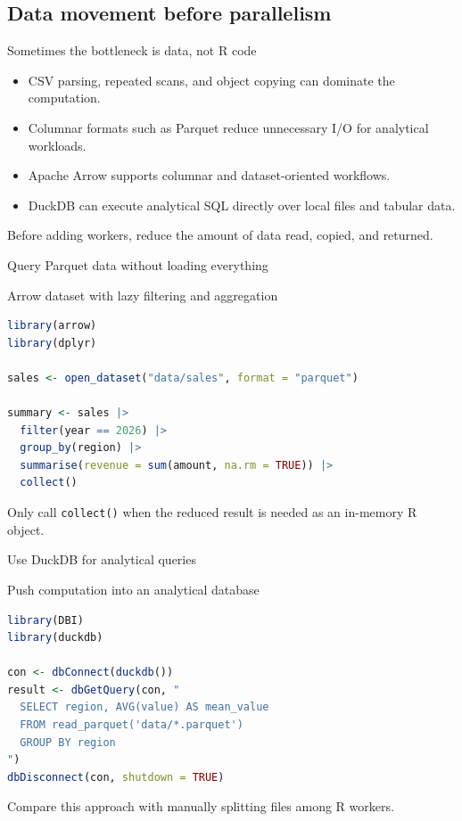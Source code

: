 \subsection{Data movement before parallelism}

\begin{frame}{Sometimes the bottleneck is data, not R code}
\begin{itemize}
  \item CSV parsing, repeated scans, and object copying can dominate the computation.
  \item Columnar formats such as Parquet reduce unnecessary I/O for analytical workloads.
  \item Apache Arrow supports columnar and dataset-oriented workflows.
  \item DuckDB can execute analytical SQL directly over local files and tabular data.
\end{itemize}
\vspace{0.2cm}
Before adding workers, reduce the amount of data read, copied, and returned.
\end{frame}

\begin{frame}[fragile]{Query Parquet data without loading everything}
\begin{block}{Arrow dataset with lazy filtering and aggregation}
\begin{lstlisting}[language=R]
library(arrow)
library(dplyr)

sales <- open_dataset("data/sales", format = "parquet")

summary <- sales |>
  filter(year == 2026) |>
  group_by(region) |>
  summarise(revenue = sum(amount, na.rm = TRUE)) |>
  collect()
\end{lstlisting}
\end{block}
Only call \texttt{collect()} when the reduced result is needed as an in-memory R object.
\end{frame}

\begin{frame}[fragile]{Use DuckDB for analytical queries}
\begin{block}{Push computation into an analytical database}
\begin{lstlisting}[language=R]
library(DBI)
library(duckdb)

con <- dbConnect(duckdb())
result <- dbGetQuery(con, "
  SELECT region, AVG(value) AS mean_value
  FROM read_parquet('data/*.parquet')
  GROUP BY region
")
dbDisconnect(con, shutdown = TRUE)
\end{lstlisting}
\end{block}
Compare this approach with manually splitting files among R workers.
\end{frame}


